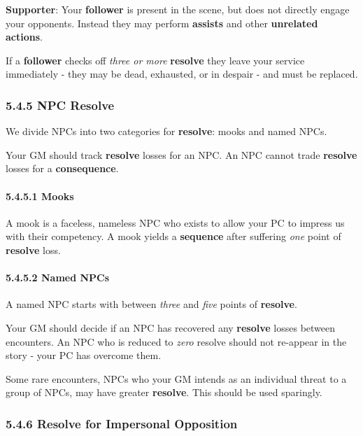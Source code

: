 \documentclass[
  11pt,
]{article}
\begin{document}
\textbf{Supporter}: Your \textbf{follower} is present in the scene, but
does not directly engage your opponents. Instead they may perform
\textbf{assists} and other \textbf{unrelated actions}.

If a \textbf{follower} checks off \emph{three or more} \textbf{resolve}
they leave your service immediately - they may be dead, exhausted, or in
despair - and must be replaced.

\hypertarget{npc-resolve}{%
\subsubsection{5.4.5 NPC Resolve}\label{npc-resolve}}

We divide NPCs into two categories for \textbf{resolve}: mooks and named
NPCs.

Your GM should track \textbf{resolve} losses for an NPC. An NPC cannot
trade \textbf{resolve} losses for a \textbf{consequence}.

\hypertarget{mooks}{%
\paragraph{5.4.5.1 Mooks}\label{mooks}}

A mook is a faceless, nameless NPC who exists to allow your PC to
impress us with their competency. A mook yields a \textbf{sequence}
after suffering \emph{one} point of \textbf{resolve} loss.

\hypertarget{named-npcs}{%
\paragraph{5.4.5.2 Named NPCs}\label{named-npcs}}

A named NPC starts with between \emph{three} and \emph{five} points of
\textbf{resolve}.

Your GM should decide if an NPC has recovered any \textbf{resolve}
losses between encounters. An NPC who is reduced to \emph{zero} resolve
should not re-appear in the story - your PC has overcome them.

Some rare encounters, NPCs who your GM intends as an individual threat
to a group of NPCs, may have greater \textbf{resolve}. This should be
used sparingly.

\hypertarget{resolve-for-impersonal-opposition}{%
\subsubsection{5.4.6 Resolve for Impersonal
Opposition}\label{resolve-for-impersonal-opposition}}
\end{document}

